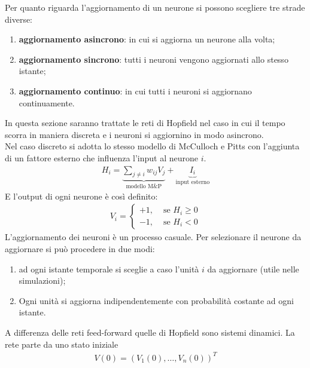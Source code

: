 \newpage

Per quanto riguarda l'aggiornamento di un neurone si possono scegliere tre strade diverse:
\begin{enumerate}
    \item \textbf{aggiornamento asincrono}: in cui si aggiorna un neurone alla volta;
    \item \textbf{aggiornamento sincrono}: tutti i neuroni vengono aggiornati allo stesso istante;
    \item \textbf{aggiornamento continuo}: in cui tutti i neuroni si aggiornano continuamente.
\end{enumerate}

In questa sezione saranno trattate le reti di Hopfield nel caso in cui il tempo scorra in maniera discreta e i neuroni si aggiornino in modo asincrono.\\

Nel caso discreto si adotta lo stesso modello di McCulloch e Pitts con l'aggiunta di un fattore esterno che influenza l'input al neurone $i$.
\begin{align}
    H_i = \underbrace{\sum_{j \neq i} w_{ij} V_j}_\textrm{modello M\&P} + \underbrace{I_i}_\textrm{input esterno}
\end{align}
E l'output di ogni neurone è così definito:
\begin{align}
    V_i =
    \begin{cases}
        +1, &\text{ se } H_i \geq 0\\
        -1, &\text{ se } H_i < 0
    \end{cases}\label{eq:learningrule}
\end{align}
L'aggiornamento dei neuroni è un processo casuale. Per selezionare il neurone da aggiornare si può procedere in due modi:
\begin{enumerate}
    \item ad ogni istante temporale si sceglie a caso l'unità $i$ da aggiornare (utile nelle simulazioni);
    \item Ogni unità si aggiorna indipendentemente con probabilità costante ad ogni istante.
\end{enumerate}

\newpage

A differenza delle reti feed-forward quelle di Hopfield sono sistemi dinamici. La rete parte da uno stato iniziale
\begin{align*}
    V(0) = (V_1(0), \dots, V_n(0))^T
\end{align*}

